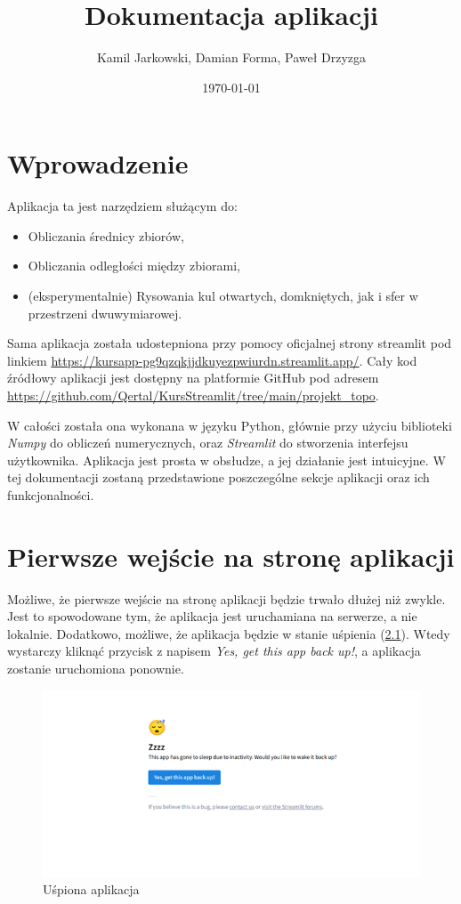 \documentclass[article,11pt]{mwrep}
\title{Dokumentacja aplikacji}
\author{Kamil Jarkowski, Damian Forma, Paweł Drzyzga}
\date{\today}
\begin{document}
\maketitle

\chapter{Wprowadzenie}

Aplikacja ta jest narzędziem służącym do:
\begin{itemize}
    \item Obliczania średnicy zbiorów,
    \item Obliczania odległości między zbiorami,
    \item (eksperymentalnie) Rysowania kul otwartych, domkniętych, jak i sfer w przestrzeni dwuwymiarowej.
\end{itemize}

Sama aplikacja została udostepniona przy pomocy oficjalnej strony streamlit pod linkiem \url{https://kursapp-pg9qzqkjjdkuyezpwiurdn.streamlit.app/}. Cały kod źródłowy aplikacji jest dostępny na platformie GitHub pod adresem \url{https://github.com/Qertal/KursStreamlit/tree/main/projekt_topo}.

W całości została ona wykonana w języku Python, głównie przy użyciu biblioteki \textit{Numpy} do obliczeń numerycznych, oraz \textit{Streamlit} do stworzenia interfejsu użytkownika. Aplikacja jest prosta w obsłudze, a jej działanie jest intuicyjne. W tej dokumentacji zostaną przedstawione poszczególne sekcje aplikacji oraz ich funkcjonalności.

\chapter{Pierwsze wejście na stronę aplikacji}

Możliwe, że pierwsze wejście na stronę aplikacji będzie trwało dłużej niż zwykle. Jest to spowodowane tym, że aplikacja jest uruchamiana na serwerze, a nie lokalnie. Dodatkowo, możliwe, że aplikacja będzie w stanie uśpienia (\ref{rys:usp}). Wtedy wystarczy kliknąć przycisk z napisem \textit{Yes, get this app back up!}, a aplikacja zostanie uruchomiona ponownie.


\begin{figure}[H] 
    \centering
    \includegraphics[width=1\textwidth]{figure/Obraz1.png}
    \caption{Uśpiona aplikacja}\label{rys:usp}
\end{figure}
\end{document}
